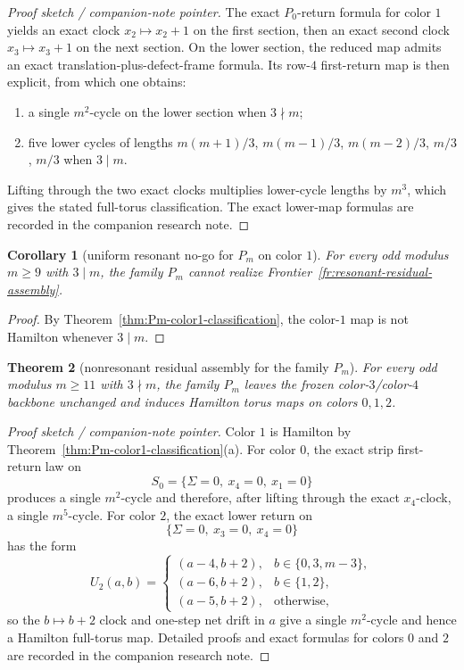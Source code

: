 \documentclass[11pt]{article}
\newtheorem{theorem}{Theorem}[section]
\newtheorem{corollary}[theorem]{Corollary}
\begin{document}
\begin{proof}[Proof sketch / companion-note pointer]
The exact $P_0$-return formula for color $1$ yields an exact clock
$x_2\mapsto x_2+1$ on the first section, then an exact second clock
$x_3\mapsto x_3+1$ on the next section.
On the lower section, the reduced map admits an exact translation-plus-defect-frame formula.
Its row-$4$ first-return map is then explicit, from which one obtains:
\begin{enumerate}[label=\textup{(\roman*)},leftmargin=2.8em]
\item a single $m^2$-cycle on the lower section when $3\nmid m$;
\item five lower cycles of lengths
      $m(m+1)/3$, $m(m-1)/3$, $m(m-2)/3$, $m/3$, $m/3$
      when $3\mid m$.
\end{enumerate}
Lifting through the two exact clocks multiplies lower-cycle lengths by $m^3$,
which gives the stated full-torus classification.
The exact lower-map formulas are recorded in the companion research note.
\end{proof}

\begin{corollary}[uniform resonant no-go for $P_m$ on color $1$]
\label{cor:Pm-color1-resonant-no-go}
For every odd modulus $m\ge 9$ with $3\mid m$, the family $P_m$ cannot realize
Frontier~\ref{fr:resonant-residual-assembly}.
\end{corollary}

\begin{proof}
By Theorem~\ref{thm:Pm-color1-classification}, the color-$1$ map is not
Hamilton whenever $3\mid m$.
\end{proof}

\begin{theorem}[nonresonant residual assembly for the family $P_m$]
\label{thm:Pm-nonresidual}
For every odd modulus $m\ge 11$ with $3\nmid m$, the family $P_m$ leaves the
frozen color-$3$/color-$4$ backbone unchanged and induces Hamilton torus maps
on colors $0,1,2$.
\end{theorem}

\begin{proof}[Proof sketch / companion-note pointer]
Color $1$ is Hamilton by Theorem~\ref{thm:Pm-color1-classification}(a).
For color $0$, the exact strip first-return law on
\[
S_0=\{\Sigma=0,\ x_4=0,\ x_1=0\}
\]
produces a single $m^2$-cycle and therefore, after lifting through the exact
$x_4$-clock, a single $m^5$-cycle.
For color $2$, the exact lower return on
\[
\{\Sigma=0,\ x_3=0,\ x_4=0\}
\]
has the form
\[
U_2(a,b)=
\begin{cases}
(a-4,b+2), & b\in\{0,3,m-3\},\\
(a-6,b+2), & b\in\{1,2\},\\
(a-5,b+2), & \text{otherwise,}
\end{cases}
\]
so the $b\mapsto b+2$ clock and one-step net drift in $a$ give a single
$m^2$-cycle and hence a Hamilton full-torus map.
Detailed proofs and exact formulas for colors $0$ and $2$ are recorded in the
companion research note.
\end{proof}
\end{document}
